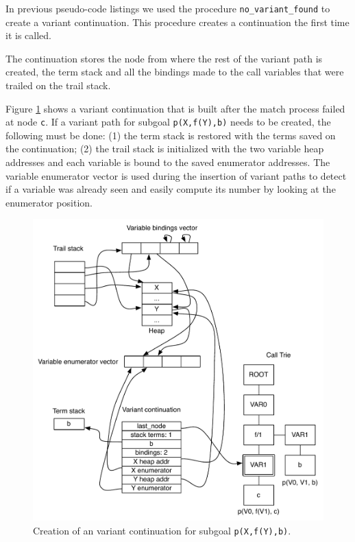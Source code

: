 In previous pseudo-code listings we used the procedure \texttt{no\_variant\_found} to create
a variant continuation. This procedure creates a continuation the first time it is called.

The continuation stores the node from where the rest of the variant path is created,
the term stack and all the bindings made to the call variables
that were trailed on the trail stack.

Figure \ref{fig:variant_continuation} shows a variant continuation that is built
after the match process failed at node \texttt{c}. If a variant path
for subgoal \texttt{p(X,f(Y),b)} needs to be created, the following must be done:
(1) the term stack is restored with the terms saved on the continuation;
(2) the trail stack is initialized with
the two variable heap addresses and each variable is bound to the saved
enumerator addresses. The variable enumerator vector is used during the insertion
of variant paths to detect if a variable was already seen and easily compute its number by
looking at the enumerator position.

\begin{figure}[ht]
  \centering
    \includegraphics[scale=0.6]{variant_continuation.pdf}
  \caption{Creation of an variant continuation for subgoal \texttt{p(X,f(Y),b)}.}
  \label{fig:variant_continuation}
\end{figure}

